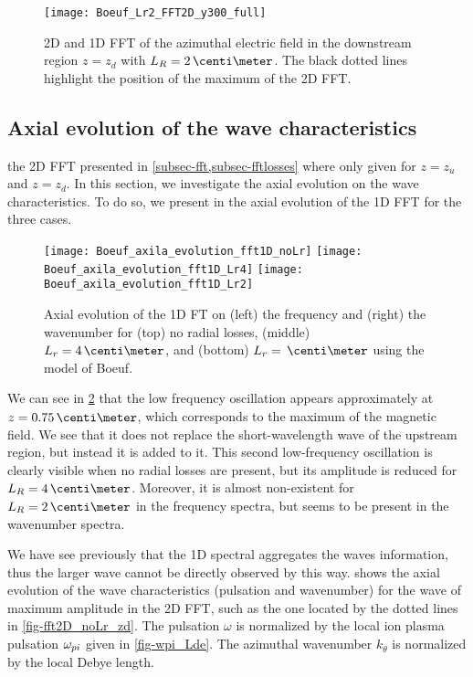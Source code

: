 \begin{figure}[hbtp]
  \centering
  \texttt{[image: Boeuf\_Lr2\_FFT2D\_y300\_full]}
  \caption{\ac{2D} and \ac{1D} \ac{FFT} of the azimuthal electric field in the downstream region $z=z_d$ with $L_R=2\,\centi\meter$.  The black dotted lines highlight the position of the maximum of the \ac{2D} \ac{FFT}.}
  \label{fig-fft2D_Lr2_zd}
\end{figure}

\subsection{Axial evolution of the wave characteristics} \label{subsec-axial_profile}

the \ac{2D} \ac{FFT} presented in \cref{subsec-fft,subsec-fftlosses} where only given for $z=z_u$ and $z=z_d$.
In this section, we investigate the axial evolution on the wave characteristics.
To do so, we present in  the axial evolution of the \ac{1D} \ac{FFT} for the three cases.
 
\begin{figure}[hbtp]
  \centering
  \texttt{[image: Boeuf\_axila\_evolution\_fft1D\_noLr]}
  \texttt{[image: Boeuf\_axila\_evolution\_fft1D\_Lr4]}
  \texttt{[image: Boeuf\_axila\_evolution\_fft1D\_Lr2]}
  \caption{Axial evolution of the \ac{1D} \ac{FT} on (left) the frequency and (right) the wavenumber for (top) no radial losses, (middle) $L_r=4\,\centi\meter$, and (bottom) $L_r=\,\centi\meter$ using the model of Boeuf. }
  \label{fig-axial_fft1D}
\end{figure}

We can see in \cref{fig-axial_fft1D} that the low frequency oscillation appears approximately at $z=0.75\,\centi\meter$, which corresponds to the maximum of the magnetic field.
We see that it does not replace the short-wavelength wave of the upstream region, but instead it is added to it.
This second low-frequency oscillation is clearly visible when no radial losses are present, but its amplitude is reduced for $L_R=4\,\centi\meter$.
Moreover, it is almost non-existent for $L_R=2\,\centi\meter$ in the frequency spectra, but seems to be present in the wavenumber spectra.

We have see previously that the \ac{1D} spectral aggregates the waves information, thus the larger wave cannot be directly observed by this way.
 shows the axial evolution of the wave characteristics (pulsation and wavenumber) for the wave of maximum amplitude in the \ac{2D} \ac{FFT}, such as the one located by the dotted lines in \cref{fig-fft2D_noLr_zd}.
The pulsation $\omega$ is normalized by the local ion plasma pulsation $\omega_{pi}$ given in \cref{fig-wpi_Lde}.
The azimuthal wavenumber $k_{\theta}$ is normalized by the local Debye length.
 

